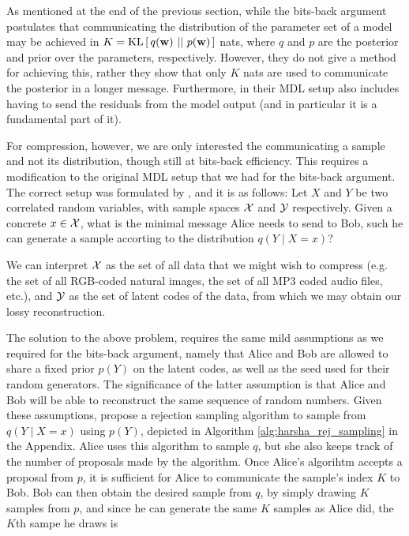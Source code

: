 \par
As mentioned at the end of the previous section, while the bits-back argument
postulates that communicating the distribution of the parameter set of a model
may be achieved in $K = \mathrm{KL}\left[\,q(\mathbf{w})\,\,||\,\,p(\mathbf{w})\,\right]$ nats, where $q$ and $p$ are the
posterior and prior over the parameters, respectively. However, they do not give
a method for achieving this, rather they show that only $K$ nats are used to
communicate the posterior in a longer message. Furthermore, in their MDL setup
also includes having to send the residuals from the model output (and in
particular it is a fundamental part of it).
\par
For compression, however, we are only interested the communicating a sample and
not its distribution, though still at bits-back efficiency. This requires a
modification to the original MDL setup that we had for the bits-back argument.
The correct setup was formulated by \cite{harsha2007communication}, and it is as
follows: Let $X$ and $Y$ be two correlated random variables, with sample spaces
$\mathcal{X}$ and $\mathcal{Y}$ respectively. Given a concrete $x \in \mathcal{X}$, what is the minimal
message Alice needs to send to Bob, such he can generate a sample accorting to
the distribution $q(Y \mid X = x)$?
\par 
We can interpret $\mathcal{X}$ as the set of all data that we might wish to compress
(e.g. the set of all RGB-coded natural images, the set of all MP3 coded audio
files, etc.), and $\mathcal{Y}$ as the set of latent codes of the data, from which we may
obtain our lossy reconstruction. 
\par
The solution to the above problem, requires the same mild assumptions as we
required for the bits-back argument, namely that Alice and Bob are allowed to
share a fixed prior $p(Y)$ on the latent codes, as well as the seed used for
their random generators. The significance of the latter assumption is that Alice
and Bob will be able to reconstruct the same sequence of random numbers. Given
these assumptions, \cite{harsha2007communication} propose a rejection sampling
algorithm to sample from $q(Y \mid X = x)$ using $p(Y)$, depicted in Algorithm
\ref{alg:harsha_rej_sampling} in the Appendix. Alice uses this algorithm to
sample $q$, but she also keeps track of the number of proposals made by the
algorithm. Once Alice's algorihtm accepts a proposal from $p$, it is sufficient
for Alice to communicate the sample's index $K$ to Bob. Bob can then obtain the
desired sample from $q$, by simply drawing $K$ samples from $p$, and since he
can generate the same $K$ samples as Alice did, the $K$th sampe he draws is
